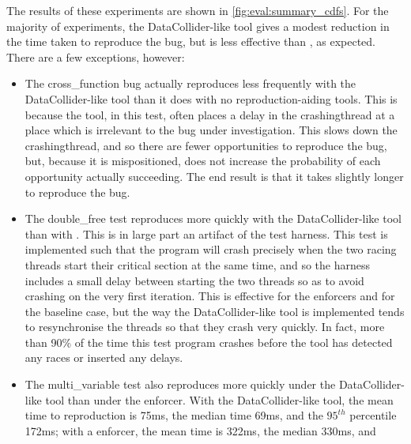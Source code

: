
The results of these experiments are shown in
\autoref{fig:eval:summary_cdfs}.  For the majority of experiments,
the DataCollider-like tool gives a modest reduction in the time taken
to reproduce the bug, but is less effective than {\technique}, as
expected.  There are a few exceptions, however:

\begin{itemize}
\item The cross\_function bug actually reproduces less frequently with
  the DataCollider-like tool than it does with no reproduction-aiding
  tools.  This is because the tool, in this test, often places a delay
  in the \gls{crashingthread} at a place which is irrelevant to the
  bug under investigation.  This slows down the \gls{crashingthread},
  and so there are fewer opportunities to reproduce the bug, but,
  because it is mispositioned, does not increase the probability of
  each opportunity actually succeeding.  The end result is that it
  takes slightly longer to reproduce the bug.
\item The double\_free test reproduces more quickly with the
  DataCollider-like tool than with {\technique}.  This is in large
  part an artifact of the test harness.  This test is implemented such
  that the program will crash precisely when the two racing threads
  start their critical section at the same time, and so the harness
  includes a small delay between starting the two threads so as to
  avoid crashing on the very first iteration.  This is effective for
  the {\technique} enforcers and for the baseline case, but the way
  the DataCollider-like tool is implemented tends to resynchronise the
  threads so that they crash very quickly.  In fact, more than 90\% of
  the time this test program crashes before the tool has detected any
  races or inserted any delays.
\item The multi\_variable test also reproduces more quickly under the
  DataCollider-like tool than under the {\technique} enforcer.  With
  the DataCollider-like tool, the mean time to reproduction is 75ms,
  the median time 69ms, and the $95^{th}$ percentile 172ms; with a
  {\technique} enforcer, the mean time is 322ms, the median 330ms, and

\end{itemize}
